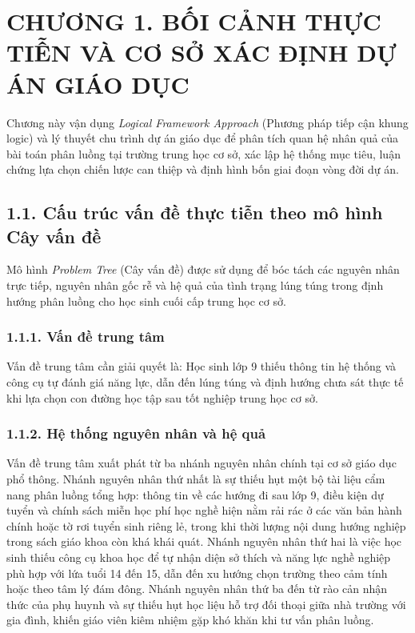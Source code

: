 \section*{CHƯƠNG 1. BỐI CẢNH THỰC TIỄN VÀ CƠ SỞ XÁC ĐỊNH DỰ ÁN GIÁO DỤC}

Chương này vận dụng \textit{Logical Framework Approach} (Phương pháp tiếp cận khung logic) và lý thuyết chu trình dự án giáo dục để phân tích quan hệ nhân quả của bài toán phân luồng tại trường trung học cơ sở, xác lập hệ thống mục tiêu, luận chứng lựa chọn chiến lược can thiệp và định hình bốn giai đoạn vòng đời dự án.

\subsection*{1.1. Cấu trúc vấn đề thực tiễn theo mô hình Cây vấn đề}

Mô hình \textit{Problem Tree} (Cây vấn đề) được sử dụng để bóc tách các nguyên nhân trực tiếp, nguyên nhân gốc rễ và hệ quả của tình trạng lúng túng trong định hướng phân luồng cho học sinh cuối cấp trung học cơ sở.

\subsubsection*{1.1.1. Vấn đề trung tâm}

Vấn đề trung tâm cần giải quyết là: Học sinh lớp 9 thiếu thông tin hệ thống và công cụ tự đánh giá năng lực, dẫn đến lúng túng và định hướng chưa sát thực tế khi lựa chọn con đường học tập sau tốt nghiệp trung học cơ sở.

\subsubsection*{1.1.2. Hệ thống nguyên nhân và hệ quả}

Vấn đề trung tâm xuất phát từ ba nhánh nguyên nhân chính tại cơ sở giáo dục phổ thông. Nhánh nguyên nhân thứ nhất là sự thiếu hụt một bộ tài liệu cẩm nang phân luồng tổng hợp: thông tin về các hướng đi sau lớp 9, điều kiện dự tuyển và chính sách miễn học phí học nghề hiện nằm rải rác ở các văn bản hành chính hoặc tờ rơi tuyển sinh riêng lẻ, trong khi thời lượng nội dung hướng nghiệp trong sách giáo khoa còn khá khái quát. Nhánh nguyên nhân thứ hai là việc học sinh thiếu công cụ khoa học để tự nhận diện sở thích và năng lực nghề nghiệp phù hợp với lứa tuổi 14 đến 15, dẫn đến xu hướng chọn trường theo cảm tính hoặc theo tâm lý đám đông. Nhánh nguyên nhân thứ ba đến từ rào cản nhận thức của phụ huynh và sự thiếu hụt học liệu hỗ trợ đối thoại giữa nhà trường với gia đình, khiến giáo viên kiêm nhiệm gặp khó khăn khi tư vấn phân luồng.

